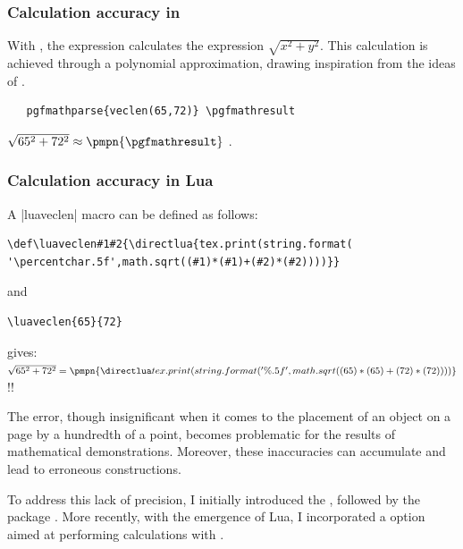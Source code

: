 \subsubsection{Calculation accuracy in \TIKZ}
With \TIKZ,  the expression  calculates the expression $\sqrt{x^2+y^2}$.
This calculation is achieved through a polynomial approximation, drawing inspiration from the ideas  of .

 
\begin{mybox}{}
\begin{verbatim}
   pgfmathparse{veclen(65,72)} \pgfmathresult
\end{verbatim}
\end{mybox}

 \tkzHand $\sqrt{65^2+72^2} \approx \pmpn{\pgfmathresult} $ .

\subsubsection{Calculation accuracy in Lua}
A |luaveclen| macro can be defined as follows:

\begin{mybox}{}
\begin{verbatim}
\def\luaveclen#1#2{\directlua{tex.print(string.format(
'\percentchar.5f',math.sqrt((#1)*(#1)+(#2)*(#2))))}}
\end{verbatim}
\end{mybox}

and

\begin{mybox}
\begin{verbatim}
\luaveclen{65}{72}
\end{verbatim}
\end{mybox}

gives: \tkzHand $\sqrt{65^2+72^2} = \pmpn{\luaveclen{65}{72}} $ {\color{red}!!}

\medskip
The error, though insignificant when it comes to the placement of an object on a page by a hundredth of a point, becomes problematic for the results of mathematical demonstrations. Moreover, these inaccuracies can accumulate and lead to erroneous constructions.

\vspace{.5em}
To address this lack of precision, I initially introduced the , followed by the package . More recently, with the emergence of Lua\LATEX{}, I incorporated a  option aimed at performing calculations with .

